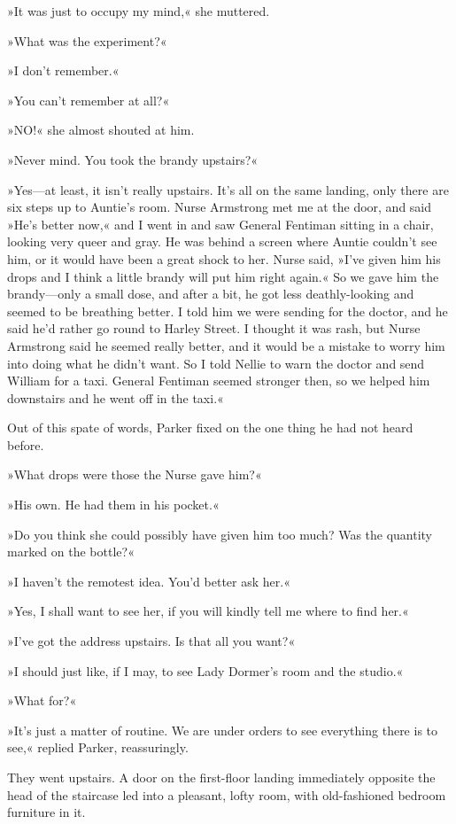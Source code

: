 »It was just to occupy my mind,« she muttered.

»What was the experiment?«

»I don't remember.«

»You can't remember at all?«

»NO!« she almost shouted at him.

»Never mind. You took the brandy upstairs?«

»Yes\allowbreak---\allowbreak at least, it isn't really upstairs. It's all on the same landing, only there are six steps up to Auntie's room. Nurse Armstrong met me at the door, and said »He's better now,« and I went in and saw General Fentiman sitting in a chair, looking very queer and gray. He was behind a screen where Auntie couldn't see him, or it would have been a great shock to her. Nurse said, »I've given him his drops and I think a little brandy will put him right again.« So we gave him the brandy\allowbreak---\allowbreak only a small dose, and after a bit, he got less deathly-looking and seemed to be breathing better. I told him we were sending for the doctor, and he said he'd rather go round to Harley Street. I thought it was rash, but Nurse Armstrong said he seemed really better, and it would be a mistake to worry him into doing what he didn't want. So I told Nellie to warn the doctor and send William for a taxi. General Fentiman seemed stronger then, so we helped him downstairs and he went off in the taxi.«

Out of this spate of words, Parker fixed on the one thing he had not heard before.

»What drops were those the Nurse gave him?«

»His own. He had them in his pocket.«

»Do you think she could possibly have given him too much? Was the quantity marked on the bottle?«

»I haven't the remotest idea. You'd better ask her.«

»Yes, I shall want to see her, if you will kindly tell me where to find her.«

»I've got the address upstairs. Is that all you want?«

»I should just like, if I may, to see Lady Dormer's room and the studio.«

»What for?«

»It's just a matter of routine. We are under orders to see everything there is to see,« replied Parker, reassuringly.

They went upstairs. A door on the first-floor landing immediately opposite the head of the staircase led into a pleasant, lofty room, with old-fashioned bedroom furniture in it.

